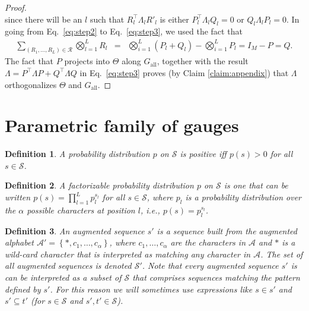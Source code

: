 \documentclass{article}
\numberwithin{myclaim}{section}
\newcommand{\eq}[1]{Eq.\ \ref{#1}}
\newcommand{\set}[1]{\left\{ #1 \right\}}
\newtheorem{definition}{Definition}
\begin{document}
\begin{proof}
\begin{equation}
\end{equation}
since there will be an $l$ such that $R_l^\top \Lambda_l R'_l$ is either $P_l^\top \Lambda_l Q_l = 0$ or $Q_l \Lambda_l P_l = 0$. In going from \eq{eq:step2} to \eq{eq:step3}, we used the fact that
\begin{eqnarray}
    \sum_{(R_1, \ldots, R_L) \in \mathcal{R}} \bigotimes_{l=1}^L R_l &=& \bigotimes_{i=1}^L (P_l + Q_l) - \bigotimes_{i=1}^L P_l 
    = I_M - P 
    = Q.
\end{eqnarray}
The fact that $P$ projects into $\Theta$ along $G_\mathrm{all}$, together with the result $\Lambda = P^\top \Lambda P + Q^\top \Lambda Q$ in \eq{eq:step3} proves (by Claim \ref{claim:appendix}) that $\Lambda$ orthogonalizes $\Theta$ and $G_\mathrm{all}$.  

\end{proof}


\section{Parametric family of gauges}

\begin{definition}
    A probability distribution $p$ on $\mathcal{S}$ is positive iff $p(s) > 0$ for all $s \in \mathcal{S}$.
\end{definition}

\begin{definition}
    A factorizable probability distribution $p$ on $\mathcal{S}$ is one that can be written $p(s) = \prod_{l=1}^L p_l^{s_l}$ for all $s \in \mathcal{S}$, where $p_l$ is a probability distribution over the $\alpha$ possible characters at position $l$, i.e., $p(s) = p_l^{s_l}$.
\end{definition}

\begin{definition}
An augmented sequence $s'$ is a sequence built from the augmented alphabet $\mathcal{A}' = \set{*, c_1, \ldots, c_\alpha}$, where $c_1, \ldots, c_\alpha$ are the characters in $\mathcal{A}$ and $*$ is a wild-card character  that is interpreted as matching any character in $\mathcal{A}$. The set of all augmented sequences is denoted $\mathcal{S'}$. Note that every augmented sequence $s'$ is can be interpreted as a subset of $\mathcal{S}$ that comprises sequences matching the pattern defined by $s'$. For this reason we will sometimes use expressions like $s \in s'$ and $s' \subseteq t'$ (for $s \in \mathcal{S}$ and $s',t' \in \mathcal{S}$).
\end{definition}
\end{document}
